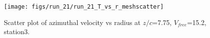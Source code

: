 \begin{figure}[H]
\centering
\texttt{[image: figs/run\_21/run\_21\_T\_vs\_r\_meshscatter]}
\caption{Scatter plot of azimuthal velocity vs radius at $z/c$=7.75, $V_{free}$=15.2, station3.}
\label{fig:run_21_T_vs_r_meshscatter}
\end{figure}



